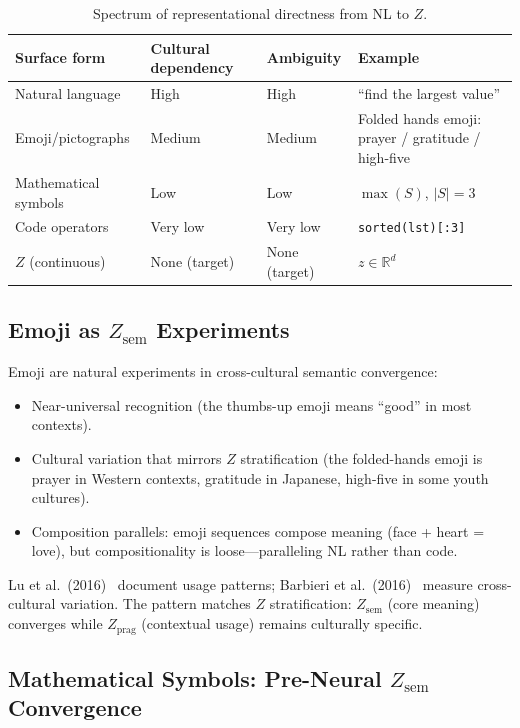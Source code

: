 \documentclass[11pt]{article}
\theoremstyle{definition}
\newcommand{\Zsem}{Z_{\text{sem}}}
\newcommand{\Zprag}{Z_{\text{prag}}}
\begin{document}
\begin{table}[h]
\centering
\caption{Spectrum of representational directness from NL to $Z$.}
\label{tab:spectrum}
\small
\begin{tabularx}{\textwidth}{l l l L}
\toprule
\textbf{Surface form} & \textbf{Cultural dependency} & \textbf{Ambiguity} & \textbf{Example} \\
\midrule
Natural language & High & High & ``find the largest value'' \\
Emoji/pictographs & Medium & Medium & Folded hands emoji: prayer / gratitude / high-five \\
Mathematical symbols & Low & Low & $\max(S)$, $|S| = 3$ \\
Code operators & Very low & Very low & \texttt{sorted(lst)[:3]} \\
$Z$ (continuous) & None (target) & None (target) & $z \in \mathbb{R}^d$ \\
\bottomrule
\end{tabularx}
\end{table}

\subsection{Emoji as $\Zsem$ Experiments}

Emoji are natural experiments in cross-cultural semantic convergence:
\begin{itemize}[nosep]
  \item Near-universal recognition (the thumbs-up emoji means ``good'' in most contexts).
  \item Cultural variation that mirrors $Z$ stratification (the folded-hands emoji is prayer in Western contexts, gratitude in Japanese, high-five in some youth cultures).
  \item Composition parallels: emoji sequences compose meaning (face + heart = love), but compositionality is loose---paralleling NL rather than code.
\end{itemize}

Lu et al.\ (2016)~\cite{lu2016emoji} document usage patterns; Barbieri et al.\ (2016)~\cite{barbieri2016emoji} measure cross-cultural variation. The pattern matches $Z$ stratification: $\Zsem$ (core meaning) converges while $\Zprag$ (contextual usage) remains culturally specific.

\subsection{Mathematical Symbols: Pre-Neural $\Zsem$ Convergence}
\end{document}
